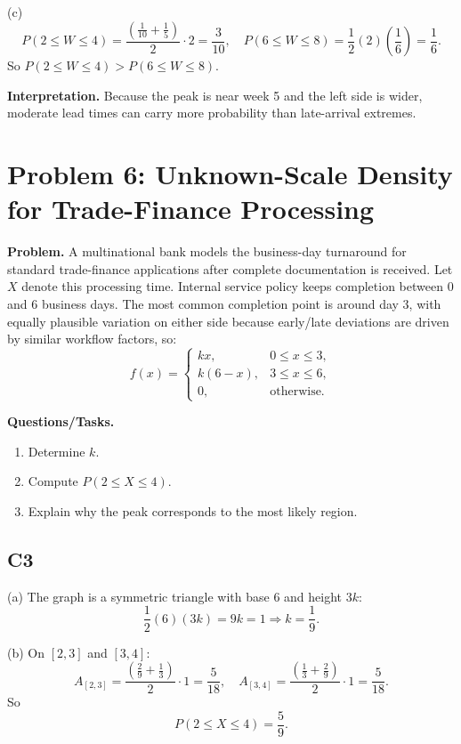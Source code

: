 (c)
\[
P(2\le W\le 4)=\frac{\left(\frac1{10}+\frac15\right)}{2}\cdot2=\frac3{10},
\quad
P(6\le W\le 8)=\frac12(2)\left(\frac16\right)=\frac16.
\]
So $P(2\le W\le 4)>P(6\le W\le 8)$.

\textbf{Interpretation.}
Because the peak is near week 5 and the left side is wider, moderate lead times can carry more probability than late-arrival extremes.

\section{Problem 6: Unknown-Scale Density for Trade-Finance Processing}

\textbf{Problem.}
A multinational bank models the business-day turnaround for standard trade-finance applications after complete documentation is received. Let $X$ denote this processing time. Internal service policy keeps completion between $0$ and $6$ business days. The most common completion point is around day $3$, with equally plausible variation on either side because early/late deviations are driven by similar workflow factors, so:
\[
f(x)=\begin{cases}
kx, & 0\le x\le 3,\\
k(6-x), & 3\le x\le 6,\\
0, & \text{otherwise.}
\end{cases}
\]

\textbf{Questions/Tasks.}
\begin{enumerate}[label=(\alph*)]
\item Determine $k$.
\item Compute $P(2\le X\le 4)$.
\item Explain why the peak corresponds to the most likely region.
\end{enumerate}

\subsection*{C3}
(a) The graph is a symmetric triangle with base $6$ and height $3k$:
\[
\frac12(6)(3k)=9k=1\Rightarrow k=\frac19.
\]

(b) On $[2,3]$ and $[3,4]$:
\[
A_{[2,3]}=\frac{\left(\frac29+\frac13\right)}{2}\cdot1=\frac{5}{18},
\quad
A_{[3,4]}=\frac{\left(\frac13+\frac29\right)}{2}\cdot1=\frac{5}{18}.
\]
So
\[
P(2\le X\le 4)=\frac{5}{9}.
\]

